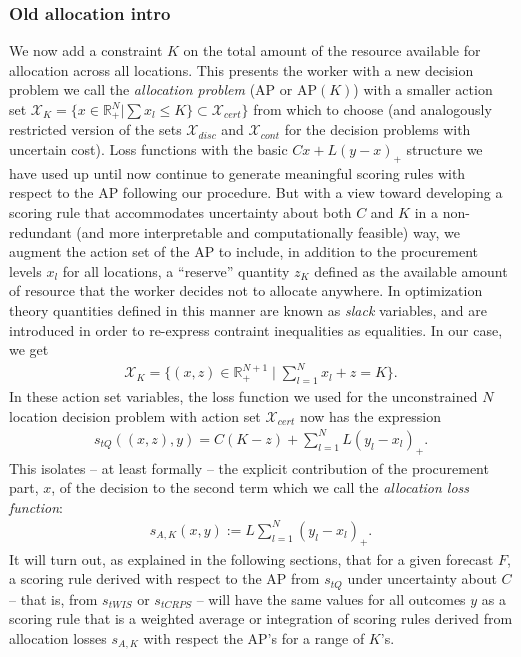 \documentclass{article}
\begin{document}
\subsubsection*{Old allocation intro}
We now add a constraint $K$ on the total amount of the resource available for allocation across all locations. This presents the worker with a new decision problem we call the \emph{allocation problem} (AP or $\mathrm{AP}(K)$) with a smaller action set $\mathcal{X}_K = \{x \in \mathbb{R}_{+}^N | \sum x_l \leq K\} \subset \mathcal{X}_{cert}\}$ from which to choose (and analogously restricted version of the sets $\mathcal{X}_{disc}$ and $\mathcal{X}_{cont}$ for the decision problems with uncertain cost). Loss functions with the basic $Cx + L(y-x)_{+}$ structure we have used up until now continue to generate meaningful scoring rules with respect to the AP following our procedure.  But with a view toward developing a scoring rule that accommodates uncertainty about both $C$ and $K$ in a non-redundant (and more interpretable and computationally feasible) way, we augment the action set of the AP to include, in addition to the procurement levels $x_l$ for all locations, a ``reserve'' quantity $z_K$ defined as the available amount of resource that the worker decides not to allocate anywhere.
In optimization theory quantities defined in this manner are known as \emph{slack} variables, and are introduced in order to re-express contraint inequalities as equalities.  In our case, we get
\begin{align}
\mathcal{X}_{K} = \{(x,z) \in \mathbb{R}_{+}^{N+1} \mid \sum_{l=1}^{N}x_l + z = K \}.
\end{align}
In these action set variables, the loss function we used for the unconstrained $N$ location decision problem with action set $\mathcal{X}_{cert}$ now has the expression
\begin{align}
s_{tQ}\left((x,z), y\right) = C(K-z) + \sum_{l=1}^{N} L(y_l - x_l)_{+}.
\end{align}
This isolates -- at least formally -- the explicit contribution of the procurement part, $x$, of the decision to the second term which we call the \emph{allocation loss function}:
\begin{align}
s_{A,K}(x,y):= L\sum_{l=1}^{N} (y_l - x_l)_{+}.
\end{align}
It will turn out, as explained in the following sections, that for a given forecast $F$, a scoring rule derived with respect to the AP from $s_{tQ}$ under uncertainty about $C$ -- that is, from $s_{tWIS}$ or $s_{tCRPS}$ -- will have the same values for all outcomes $y$ as a scoring rule that is a weighted average or integration of scoring rules derived from allocation losses $s_{A,K}$ with respect the AP's for a range of $K$'s.
\end{document}
